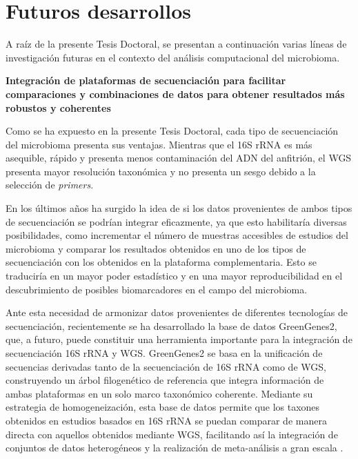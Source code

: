 

\chapter{Futuros desarrollos}
\label{chap:future}

A raíz de la presente Tesis Doctoral, se presentan a continuación varias líneas de investigación futuras en el contexto del análisis computacional del microbioma.

\textbf{Integración de plataformas de secuenciación para facilitar comparaciones y combinaciones de datos para obtener resultados más robustos y coherentes}


Como se ha expuesto en la presente Tesis Doctoral, cada tipo de secuenciación del microbioma presenta sus ventajas. Mientras que el 16S rRNA es más asequible, rápido y presenta menos contaminación del ADN del anfitrión, el WGS presenta mayor resolución taxonómica y no presenta un sesgo debido a la selección de \textit{primers}.

En los últimos años ha surgido la idea de si los datos provenientes de ambos tipos de secuenciación se podrían integrar eficazmente, ya que esto habilitaría diversas posibilidades, como incrementar el número de muestras accesibles de estudios del microbioma y comparar los resultados obtenidos en uno de los tipos de secuenciación con los obtenidos en la plataforma complementaria. Esto se traduciría en un mayor poder estadístico y en una mayor reproducibilidad en el descubrimiento de posibles biomarcadores en el campo del microbioma.

Ante esta necesidad de armonizar datos provenientes de diferentes tecnologías de secuenciación, recientemente se ha desarrollado la base de datos GreenGenes2, que, a futuro, puede constituir una herramienta importante para la integración de secuenciación 16S rRNA y WGS. GreenGenes2 \cite{mcdonald2024greengenes2} se basa en la unificación de secuencias derivadas tanto de la secuenciación de 16S rRNA como de WGS, construyendo un árbol filogenético de referencia que integra información de ambas plataformas en un solo marco taxonómico coherente. Mediante su estrategia de homogeneización, esta base de datos permite que los taxones obtenidos en estudios basados en 16S rRNA se puedan comparar de manera directa con aquellos obtenidos mediante WGS, facilitando así la integración de conjuntos de datos heterogéneos y la realización de meta-análisis a gran escala \cite{mcdonald2024greengenes2}.

